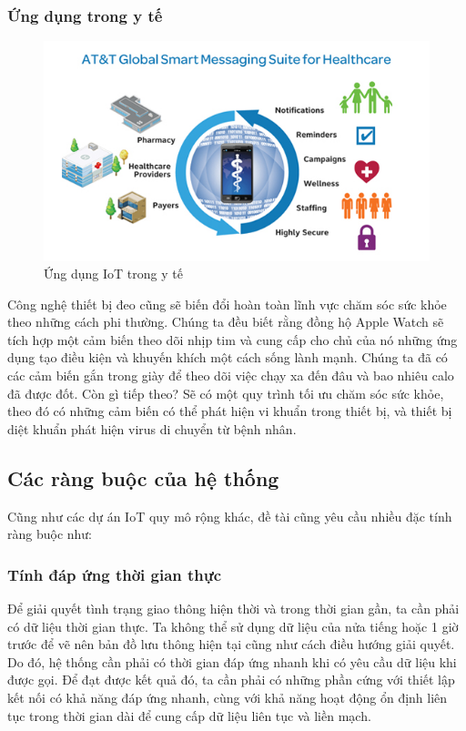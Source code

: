 \subsubsection*{Ứng dụng trong y tế}
\begin{figure}[H] 
	\centering    
	\includegraphics[width=1\textwidth]{pic11}
	\caption[Ứng dụng IoT trong y tế ]{Ứng dụng IoT trong y tế}
	\label{fig:pic11}
\end{figure}
Công nghệ thiết bị đeo cũng sẽ biến đổi hoàn toàn lĩnh vực chăm sóc sức khỏe theo những cách phi thường. Chúng ta đều biết rằng đồng hộ Apple Watch sẽ tích hợp một cảm biến theo dõi nhịp tim và cung cấp cho chủ của nó những ứng dụng tạo điều kiện và khuyến khích một cách sống lành mạnh. Chúng ta đã có các cảm biến gắn trong giày để theo dõi việc chạy xa đến đâu và bao nhiêu calo đã được đốt. Còn gì tiếp theo? Sẽ có một quy trình tối ưu chăm sóc sức khỏe, theo đó có những cảm biến có thể phát hiện vi khuẩn trong thiết bị, và thiết bị diệt khuẩn phát hiện virus di chuyển từ bệnh nhân.
\subsection{Các ràng buộc của hệ thống}
Cũng như các dự án IoT quy mô rộng khác, đề tài cũng yêu cầu nhiều đặc tính ràng buộc như:  
\subsubsection*{Tính đáp ứng thời gian thực}Để giải quyết tình trạng giao thông hiện thời và trong thời gian gần, ta cần phải có dữ liệu thời gian thực. Ta không thể sử dụng dữ liệu của nửa tiếng hoặc 1 giờ trước để vẽ nên bản đồ lưu thông hiện tại cũng như cách điều hướng giải quyết. Do đó, hệ thống cần phải có thời gian đáp ứng nhanh khi có yêu cầu dữ liệu khi được gọi. Để đạt được kết quả đó, ta cần phải có những phần cứng với thiết lập kết nối có khả năng đáp ứng nhanh, cùng với khả năng hoạt động ổn định liên tục trong thời gian dài để cung cấp dữ liệu liên tục và liền mạch.


